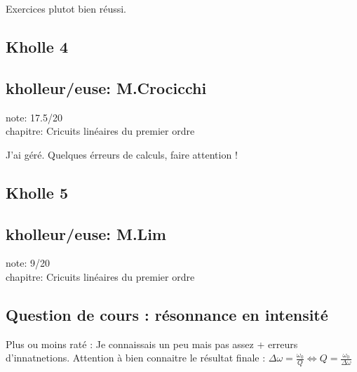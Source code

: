 \documentclass{article}
\begin{document}
Exercices plutot bien réussi. \\


\subsection{Kholle 4}
\subsection{kholleur/euse: M.Crocicchi}

note: 17.5/20 \\
chapitre: Cricuits linéaires du premier ordre

J'ai géré. Quelques érreurs de calculs, faire attention !


\subsection{Kholle 5}
\subsection{kholleur/euse: M.Lim}

note: 9/20 \\
chapitre: Cricuits linéaires du premier ordre

\subsection{Question de cours : résonnance en intensité}

Plus ou moins raté : Je connaissais un peu mais pas assez + erreurs d'innatnetions. Attention à bien connaitre le résultat finale : $\Delta \omega = \frac{\omega_0}{Q} \Leftrightarrow Q = \frac{\omega_0}{\Delta \omega}$ \\
\end{document}
